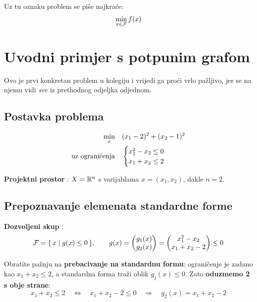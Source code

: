 Uz tu oznaku problem se piše najkraće:
\[
\min_{x \in \Feas} f(x)
\]

\section{Uvodni primjer s potpunim grafom}
\label{sec:uvodni-primjer}

Ovo je prvi konkretan problem u kolegiju i vrijedi ga proći vrlo pažljivo, jer
se na njemu vidi \emph{sve} iz prethodnog odjeljka odjednom.

\subsection{Postavka problema}

\begin{equation}
\begin{aligned}
\min_x \quad & (x_1 - 2)^2 + (x_2 - 1)^2 \\
\uzogr &
\begin{cases}
x_1^2 - x_2 \le 0 \\
x_1 + x_2 \le 2
\end{cases}
\end{aligned}
\end{equation}

\textbf{Projektni prostor} : $X = \R^n$ s varijablama
$x = (x_1, x_2)$, dakle $n = 2$.

\subsection{Prepoznavanje elemenata standardne forme}

\textbf{Dozvoljeni skup} :
\[
\Feas = \{\, x \mid g(x) \le 0 \,\}, \qquad
g(x) = \begin{pmatrix} g_1(x) \\ g_2(x) \end{pmatrix}
= \begin{pmatrix} x_1^2 - x_2 \\ x_1 + x_2 - 2 \end{pmatrix} \le 0
\]

Obratite pažnju na \textbf{prebacivanje na standardnu formu}: ograničenje je
zadano kao $x_1 + x_2 \le 2$, a standardna forma traži oblik $g_j(x) \le 0$.
Zato \textbf{oduzmemo 2 s obje strane}:
\[
x_1 + x_2 \le 2 \quad \Longleftrightarrow \quad x_1 + x_2 - 2 \le 0
\quad \Longrightarrow \quad g_2(x) = x_1 + x_2 - 2
\]


